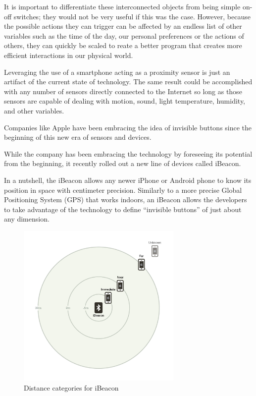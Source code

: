 It is important to differentiate these interconnected objects from being simple on-off switches; they would not be very useful if this was the case. However, because the possible actions they can trigger can be affected by an endless list of other variables such as the time of the day, our personal preferences or the actions of others, they can quickly be scaled to reate a better program that creates more efficient interactions in our physical world.

Leveraging the use of a smartphone acting as a proximity sensor is just an artifact of the current state of technology. The same result could be accomplished with any number of sensors directly connected to the Internet so long as those sensors are capable of dealing with motion, sound, light temperature, humidity, and other variables.

Companies like Apple have been embracing the idea of invisible buttons since the beginning of this new era of sensors and devices. 

While the company has been embracing the technology by foreseeing its potential from the beginning, it recently rolled out a new line of devices called iBeacon.

In a nutshell, the iBeacon allows any newer iPhone or Android phone to know its position in space with centimeter precision. Similarly to a more precise Global Positioning System (GPS) that works indoors, an iBeacon allows the developers to take advantage of the technology to define “invisible buttons” of just about any dimension.

\vspace{0.5cm}
\begin{figure}[htbp]
  \centering
    \includegraphics[height=8cm]{images/ibeacon-distance.jpg}
  \caption{Distance categories for iBeacon}
  \label{fig:ibeacon}
\end{figure}
\vspace{0.5cm}


